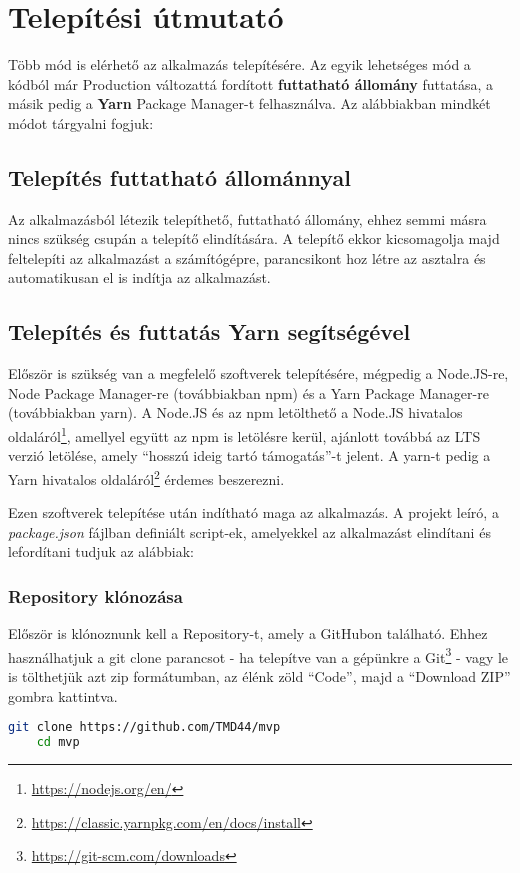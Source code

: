 \section{Telepítési útmutató}
Több mód is elérhető az alkalmazás telepítésére. Az egyik lehetséges mód a kódból már Production változattá fordított {\textbf {futtatható állomány}} futtatása, a másik pedig a {\textbf {Yarn}} Package Manager-t felhasználva. Az alábbiakban mindkét módot tárgyalni fogjuk:

\subsection{Telepítés futtatható állománnyal}
Az alkalmazásból létezik telepíthető, futtatható állomány, ehhez semmi másra nincs szükség csupán a telepítő elindítására. A telepítő ekkor kicsomagolja majd feltelepíti az alkalmazást a számítógépre, parancsikont hoz létre az asztalra és automatikusan el is indítja az alkalmazást.

\subsection{Telepítés és futtatás Yarn segítségével}
Először is szükség van a megfelelő szoftverek telepítésére, mégpedig a Node.JS-re, Node Package Manager-re (továbbiakban npm) és a Yarn Package Manager-re (továbbiakban yarn). A Node.JS és az npm letölthető a Node.JS hivatalos oldaláról\footnote{\url{https://nodejs.org/en/}}, amellyel együtt az npm is letölésre kerül, ajánlott továbbá az LTS verzió letölése, amely ``hosszú ideig tartó támogatás''-t jelent. A yarn-t pedig a Yarn hivatalos oldaláról\footnote{\url{https://classic.yarnpkg.com/en/docs/install}} érdemes beszerezni.

Ezen szoftverek telepítése után indítható maga az alkalmazás. A projekt leíró, a {\it package.json} fájlban definiált script-ek, amelyekkel az alkalmazást elindítani és lefordítani tudjuk az alábbiak:

\subsubsection{Repository klónozása}
Először is klónoznunk kell a Repository-t, amely a GitHubon található. Ehhez használhatjuk a git clone parancsot - ha telepítve van a gépünkre a Git\footnote{\url{https://git-scm.com/downloads}} - vagy le is tölthetjük azt zip formátumban, az élénk zöld ``Code'', majd a ``Download ZIP'' gombra kattintva.
\begin{lstlisting}[language={Bash}, numbers={none}]
    git clone https://github.com/TMD44/mvp
    cd mvp
\end{lstlisting}

